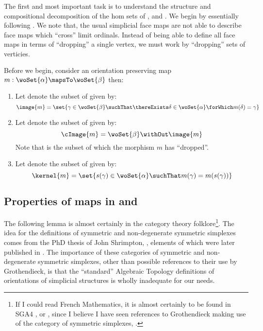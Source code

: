 The first and most important task is to understand the structure and compositional
decomposition of the hom sets of \sDeltaC{}{}, \DeltaC{}{} and \ndDeltaC{}{}.  We begin by
essentially following \cite[Notation 3 and Observations 7 and 8]{verity2005complicialSets}. 
We note that, the usual simplicial face maps are not able to describe face maps which
``cross'' limit ordinals.  Instead of being able to define all face maps in terms of
``dropping'' a single vertex, we must work by ``dropping'' sets of verticies.

Before we begin, consider an orientation preserving map $m : \woSet{\alpha} \mapsTo
\woSet{\beta}$ then:
\begin{enumerate}
\item Let  denote the subset of \woSet{\beta} given by:
\begin{equation*}
	\image{m} = \set{ \gamma \in \woSet{\beta} \suchThat \thereExists \delta \in \woSet{\alpha} \forWhich m(\delta) = \gamma }
\end{equation*}
\item Let  denote the subset of \woSet{\beta} given by:
\begin{equation*}
	\cImage{m} = \woSet{\beta} \withOut \image{m}
\end{equation*}
Note that  is the subset of \woSet{\beta} which the morphism $m$ has ``dropped''.
\item Let  denote the subset of \woSet{\alpha} given by:
\begin{equation*}
	\kernel{m} = \set{ s(\gamma) \in \woSet{\alpha} \suchThat m(\gamma) = m(s(\gamma)) }
\end{equation*}
\end{enumerate}

\subsection{Properties of maps in \texorpdfstring{\sNdDeltaC{}{}}{sNdDelta} and
\texorpdfstring{\sDeltaC{}{}}{ndDelta}}

The following lemma is almost certainly in the category theory folklore\footnote{If I
could read French Mathematics, it is almost certainly to be found in SGA4
\cite{artinGrothendieckVerdierBourbakiDeligneSaintDonat1963SGA41},
\cite{artinGrothendieckVerdierDeligneSaintDonat1963SGA42} or
\cite{artinGrothendieckVerdierDeligneSaintDonat1963SGA43}, since I believe I have seen
references to Grothendieck making use of the category of symmetric simplexes,
\sDeltaC{}{}.}. The idea for the definitions of symmetric and non-degenerate symmetric
simplexes comes from the PhD thesis of John Shrimpton, \cite[Diagram on page
29]{shrimpton1989graphsSymmetryCatMethods}, elements of which were later published in
\cite{brownMorrisShrimptonWensley2008graphCat}. The importance of these categories of
symmetric and non-degenerate symmetric simplexes, other than possible references to their
use by Grothendieck, is that the ``standard'' Algebraic Topology definitions of
orientations of simplicial structures is wholly inadequate for our needs.

